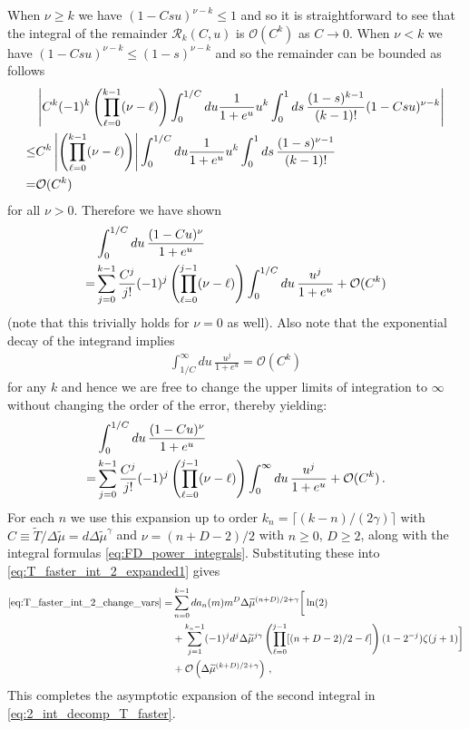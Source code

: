 \documentclass[sn-mathphys,Numbered]{sn-jnl}
\begin{document}
When $\nu\geq k$  we have $(1-Csu)^{\nu-k}\leq 1$ and so it is straightforward to see that the  integral of the remainder $\mathcal{R}_k(C,u)$ is $\mathcal{O}(C^k)$ as $C\to 0$.  When $\nu<k$ we have $(1-Csu)^{\nu-k}\leq (1-s)^{\nu-k}$ and so the remainder can be bounded as follows
\begin{align}
&\left|C^k (-1)^k\left(\prod_{\ell=0}^{k-1}(\nu-\ell)\right)\int_0^{1/C} du \frac{1}{1+e^u} u^k\int_0^1ds\,\frac{(1-s)^{k-1}}{(k-1)!} (1-Csu)^{\nu-k}\right|\notag\\
\leq&C^k\left| \left(\prod_{\ell=0}^{k-1}(\nu-\ell)\right)\right|\int_0^{1/C} du \frac{1}{1+e^u} u^k\int_0^1ds\,\frac{(1-s)^{\nu-1}}{(k-1)!} \notag\\
=&\mathcal{O}(C^k)
\end{align}
for all  $\nu>0$. Therefore we have shown
\begin{align}
&\int_0^{1/C} du \,\frac{(1-Cu)^\nu}{1+e^u}\\
=&\sum_{j=0}^{k-1}\frac{C^j}{j!}(-1)^j\left(\prod_{\ell=0}^{j-1}(\nu-\ell) \right)\int_0^{1/C} du \,\frac{u^j}{1+e^u}  +\mathcal{O}(C^k)\notag
\end{align}
(note that this trivially holds for $\nu=0$ as well).   Also note that the exponential decay of the integrand implies 
\begin{align}
\int_{1/C}^\infty du\, \frac{u^j}{1+e^u}=\mathcal{O}(C^k)
\end{align} for any $k$ and hence we are free to change the upper limits of integration to $\infty$ without changing the order of the error, thereby yielding:
\begin{align}
&\int_0^{1/C} du \,\frac{(1-Cu)^\nu}{1+e^u}\\
=&\sum_{j=0}^{k-1}\frac{C^j}{j!}(-1)^j\left(\prod_{\ell=0}^{j-1}(\nu-\ell) \right)\int_0^{\infty} du \,\frac{u^j}{1+e^u}  +\mathcal{O}(C^k)\,.\notag
\end{align}
For each $n$ we use this expansion up to order $k_n= \lceil(k-n)/(2\gamma)\rceil$ with $C\equiv \widetilde{T}/\Delta\widetilde{\mu}=d\Delta\widetilde{\mu}^{\gamma}$ and $\nu=(n+D-2)/2$ with $n\geq 0$, $D\geq 2$, along with the integral formulas 
\eqref{eq:FD_power_integrals}. Substituting  these into \eqref{eq:T_faster_int_2_expanded1} gives
\begin{align}    \label{eq:T_faster_int_2_expanded2}
    \eqref{eq:T_faster_int_2_change_vars} =&\sum_{n=0}^{k-1} da_n(m)m^{D}\Delta\widetilde{\mu}^{(n+D)/2+\gamma}\bigg[\ln(2)\\
    &+\sum_{j=1}^{k_n-1}(-1)^jd^j\Delta\widetilde{\mu}^{j\gamma}\left(\prod_{\ell=0}^{j-1}[(n+D-2)/2-\ell] \right)(1-2^{-j})\zeta(j+1)  \bigg] \notag\\
    &+\mathcal{O}\left(\Delta\widetilde{\mu}^{(k+D)/2+\gamma}\right)\notag\,,
\end{align}
This completes the asymptotic expansion of the second integral in  \eqref{eq:2_int_decomp_T_faster}.
\end{document}
